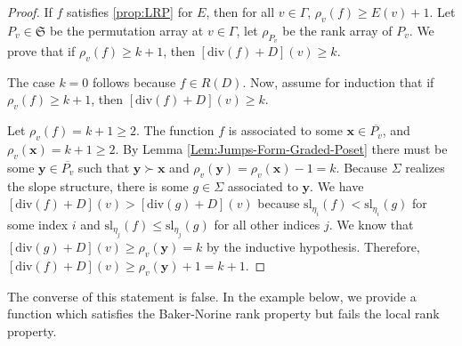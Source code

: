 \documentclass{amsart}
\begin{document}
	\begin{proof}
		If $f$ satisfies \ref{prop:LRP} for $E$, then for all $v \in \Gamma$, $\rho_v(f) \geq E(v) + 1$. Let $P_v \in \mathfrak{S}$ be the permutation array at $v \in \Gamma$, let $\rho_{P_v}$ be the rank array of $P_v$. We prove that if $\rho_v(f) \geq k+1$, then $[\mathrm{div}(f) + D](v) \geq k$.
		
		The case $k = 0$ follows because $f \in R(D)$. Now, assume for induction that if $\rho_v(f) \geq k+1$, then $[\mathrm{div}(f) + D](v) \geq k$.
		
		Let $\rho_v(f) = k + 1 \geq 2$. The function $f$ is associated to some $\mathbf{x} \in \overline{P_v}$, and $\rho_v(\mathbf{x}) = k + 1 \geq 2$. By Lemma \ref{Lem:Jumps-Form-Graded-Poset} there must be some $\mathbf{y} \in \overline{P_v}$ such that $\mathbf{y} \succ \mathbf{x}$ and $\rho_v(\mathbf{y}) = \rho_v(\mathbf{x}) - 1 = k$. Because $\Sigma$ realizes the slope structure, there is some $g \in \Sigma$ associated to $\mathbf{y}$. We have $[\mathrm{div}(f) + D](v) > [\mathrm{div}(g) + D](v)$ because $\mathrm{sl}_{\eta_i}(f) < \mathrm{sl}_{\eta_i}(g)$ for some index $i$ and $\mathrm{sl}_{\eta_j}(f) \leq \mathrm{sl}_{\eta_j}(g)$ for all other indices $j$. We know that $[\mathrm{div}(g) + D](v) \geq \rho_v(\mathbf{y}) = k$ by the inductive hypothesis. Therefore, $[\mathrm{div}(f) + D](v) \geq \rho_v(\mathbf{y}) + 1 = k + 1$.
	\end{proof}
	
	The converse of this statement is false. In the example below, we provide a function which satisfies the Baker-Norine rank property but fails the local rank property.
	
\end{document}
